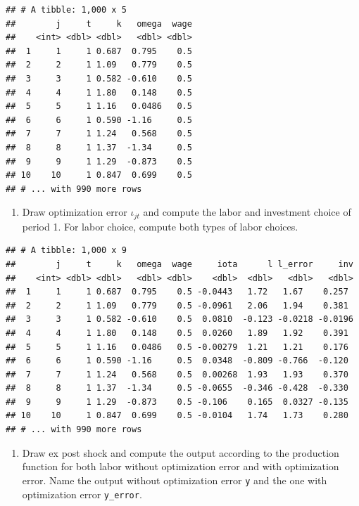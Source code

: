 \documentclass[
]{book}
\providecommand{\tightlist}{%
  \setlength{\itemsep}{0pt}\setlength{\parskip}{0pt}}
\begin{document}
\begin{verbatim}
## # A tibble: 1,000 x 5
##        j     t     k   omega  wage
##    <int> <dbl> <dbl>   <dbl> <dbl>
##  1     1     1 0.687  0.795    0.5
##  2     2     1 1.09   0.779    0.5
##  3     3     1 0.582 -0.610    0.5
##  4     4     1 1.80   0.148    0.5
##  5     5     1 1.16   0.0486   0.5
##  6     6     1 0.590 -1.16     0.5
##  7     7     1 1.24   0.568    0.5
##  8     8     1 1.37  -1.34     0.5
##  9     9     1 1.29  -0.873    0.5
## 10    10     1 0.847  0.699    0.5
## # ... with 990 more rows
\end{verbatim}

\begin{enumerate}
\def\labelenumi{\arabic{enumi}.}
\setcounter{enumi}{6}
\tightlist
\item
  Draw optimization error \(\iota_{jt}\) and compute the labor and investment choice of period 1. For labor choice, compute both types of labor choices.
\end{enumerate}

\begin{verbatim}
## # A tibble: 1,000 x 9
##        j     t     k   omega  wage     iota      l l_error     inv
##    <int> <dbl> <dbl>   <dbl> <dbl>    <dbl>  <dbl>   <dbl>   <dbl>
##  1     1     1 0.687  0.795    0.5 -0.0443   1.72   1.67    0.257 
##  2     2     1 1.09   0.779    0.5 -0.0961   2.06   1.94    0.381 
##  3     3     1 0.582 -0.610    0.5  0.0810  -0.123 -0.0218 -0.0196
##  4     4     1 1.80   0.148    0.5  0.0260   1.89   1.92    0.391 
##  5     5     1 1.16   0.0486   0.5 -0.00279  1.21   1.21    0.176 
##  6     6     1 0.590 -1.16     0.5  0.0348  -0.809 -0.766  -0.120 
##  7     7     1 1.24   0.568    0.5  0.00268  1.93   1.93    0.370 
##  8     8     1 1.37  -1.34     0.5 -0.0655  -0.346 -0.428  -0.330 
##  9     9     1 1.29  -0.873    0.5 -0.106    0.165  0.0327 -0.135 
## 10    10     1 0.847  0.699    0.5 -0.0104   1.74   1.73    0.280 
## # ... with 990 more rows
\end{verbatim}

\begin{enumerate}
\def\labelenumi{\arabic{enumi}.}
\setcounter{enumi}{7}
\tightlist
\item
  Draw ex post shock and compute the output according to the production function for both labor without optimization error and with optimization error. Name the output without optimization error \texttt{y} and the one with optimization error \texttt{y\_error}.
\end{enumerate}
\end{document}
